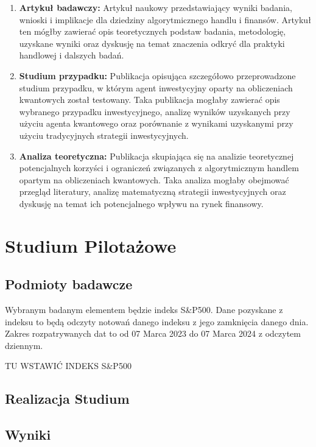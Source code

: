\documentclass[polish,envcountsect,10pt]{article}
\begin{document}
\begin{enumerate}
    \item \textbf{Artykuł badawczy:} Artykuł naukowy przedstawiający wyniki badania, wnioski i implikacje dla dziedziny algorytmicznego handlu i finansów. Artykuł ten mógłby zawierać opis teoretycznych podstaw badania, metodologię, uzyskane wyniki oraz dyskusję na temat znaczenia odkryć dla praktyki handlowej i dalszych badań.
    
    \item \textbf{Studium przypadku:} Publikacja opisująca szczegółowo przeprowadzone studium przypadku, w którym agent inwestycyjny oparty na obliczeniach kwantowych został testowany. Taka publikacja mogłaby zawierać opis wybranego przypadku inwestycyjnego, analizę wyników uzyskanych przy użyciu agenta kwantowego oraz porównanie z wynikami uzyskanymi przy użyciu tradycyjnych strategii inwestycyjnych.
    
    \item \textbf{Analiza teoretyczna:} Publikacja skupiająca się na analizie teoretycznej potencjalnych korzyści i ograniczeń związanych z algorytmicznym handlem opartym na obliczeniach kwantowych. Taka analiza mogłaby obejmować przegląd literatury, analizę matematyczną strategii inwestycyjnych oraz dyskusję na temat ich potencjalnego wpływu na rynek finansowy.
    
\end{enumerate}
\section{Studium Pilotażowe}

\subsection{Podmioty badawcze}

Wybranym badanym elementem będzie indeks S\&P500. Dane pozyskane z indeksu to będą odczyty notowań danego indeksu z jego zamknięcia danego dnia. Zakres rozpatrywanych dat to od 07 Marca 2023 do 07 Marca 2024 z odczytem dziennym. 

TU WSTAWIĆ INDEKS S\&P500



\subsection{Realizacja Studium}

\subsection{Wyniki}
\end{document}
